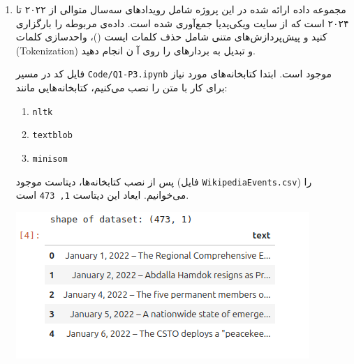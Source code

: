 \begin{enumerate}
\begin{latin}
\begin{thebibliography}{9}
		Sculley D. Web-scale k-means clustering. InProceedings of the 19th international conference on World wide web 2010 Apr 26 (pp. 1177-1178).
		
		MacQueen J. Some methods for classification and analysis of multivariate observations. InProceedings of the fifth Berkeley symposium on mathematical statistics and probability 1967 Jun 21 (Vol. 1, No. 14, pp. 281-297).
		
		
		Comaniciu D, Meer P. Mean shift: A robust approach toward feature space analysis. IEEE Transactions on pattern analysis and machine intelligence. 2002 May;24(5):603-19.
		
		Ng A, Jordan M, Weiss Y. On spectral clustering: Analysis and an algorithm. Advances in neural information processing systems. 2001;14.
		
	\end{thebibliography} 
\end{latin}
	
	
	\newpage
	
	
	
	\item مجموعه داده ارائه شده در این پروژه شامل رویداد‌های سه‌سال متوالی از ۲۰۲۲ تا ۲۰۲۴ است که از سایت ویکی‌پدیا جمع‌آوری شده است. داده‌ی مربوطه را بارگزاری کنید و پیش‌پردازش‌های متنی شامل حذف کلمات ایست ()، واحدسازی کلمات (‫‪Tokenization‬‬) و تبدیل به بردار‌های  را روی آ
	ن انجام دهید.
	
	
	
	\begin{qsolve}
		فایل کد در مسیر \texttt{Code/Q1-P3.ipynb} موجود است. ابتدا کتابخانه‌های مورد نیاز برای کار با متن را نصب می‌کنیم، کتابخانه‌هایی مانند:
		
		\begin{latin}
			\begin{enumerate}
				\item \texttt{nltk}
				\item \texttt{textblob}
				\item \texttt{minisom}
			\end{enumerate}
		\end{latin}
	
	
	پس از نصب کتابخانه‌ها، دیتاست موجود (فایل \texttt{WikipediaEvents.csv}) را می‌خوانیم. ایعاد این دیتاست \texttt{1, 473} است.
	
	 \begin{center}
		\includegraphics*[width=0.7\linewidth]{pics/img9.png}
		\label{دیتاست ورودی}
	\end{center}
	

\end{qsolve}
\end{enumerate}
